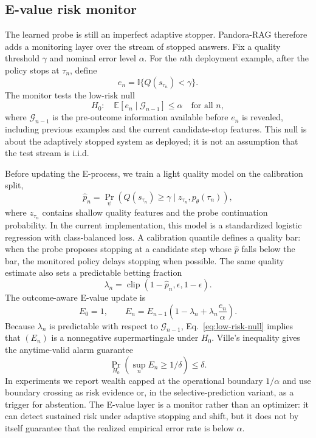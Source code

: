 \documentclass{article}
\newcommand{\method}{Pandora-RAG}
\begin{document}
\subsection{E-value risk monitor}
\label{sec:evalue-method}

The learned probe is still an imperfect adaptive stopper. \method{} therefore adds a monitoring layer over the stream of stopped answers. Fix a quality threshold $\gamma$ and nominal error level $\alpha$. For the $n$th deployment example, after the policy stops at $\tau_n$, define
\[
  e_n=\mathbb{I}\{Q(s_{\tau_n})<\gamma\}.
\]
The monitor tests the low-risk null
\begin{equation}
  H_0:\quad
  \mathbb{E}[e_n\mid\mathcal{G}_{n-1}]\le \alpha
  \quad\text{for all }n,
  \label{eq:low-risk-null}
\end{equation}
where $\mathcal{G}_{n-1}$ is the pre-outcome information available before $e_n$ is revealed, including previous examples and the current candidate-stop features. This null is about the adaptively stopped system as deployed; it is not an assumption that the test stream is i.i.d.

Before updating the E-process, we train a light quality model on the calibration split,
\[
  \hat p_n
  =
  \Pr_\psi\!\left(Q(s_{\tau_n})\ge\gamma
  \mid z_{\tau_n},p_\theta(\tau_n)\right),
\]
where $z_{\tau_n}$ contains shallow quality features and the probe continuation probability. In the current implementation, this model is a standardized logistic regression with class-balanced loss. A calibration quantile defines a quality bar: when the probe proposes stopping at a candidate step whose $\hat p$ falls below the bar, the monitored policy delays stopping when possible. The same quality estimate also sets a predictable betting fraction
\[
  \lambda_n=\operatorname{clip}(1-\hat p_n,\epsilon,1-\epsilon).
\]
The outcome-aware E-value update is
\begin{equation}
  E_0=1,\qquad
  E_n=E_{n-1}\left(1-\lambda_n+\lambda_n\frac{e_n}{\alpha}\right).
  \label{eq:evalue-update}
\end{equation}
Because $\lambda_n$ is predictable with respect to $\mathcal{G}_{n-1}$, Eq.~\eqref{eq:low-risk-null} implies that $(E_n)$ is a nonnegative supermartingale under $H_0$. Ville's inequality gives the anytime-valid alarm guarantee
\begin{equation}
  \Pr_{H_0}\left(\sup_n E_n\ge 1/\delta\right)\le \delta .
  \label{eq:ville}
\end{equation}
In experiments we report wealth capped at the operational boundary $1/\alpha$ and use boundary crossing as risk evidence or, in the selective-prediction variant, as a trigger for abstention. The E-value layer is a monitor rather than an optimizer: it can detect sustained risk under adaptive stopping and shift, but it does not by itself guarantee that the realized empirical error rate is below $\alpha$.
\end{document}
